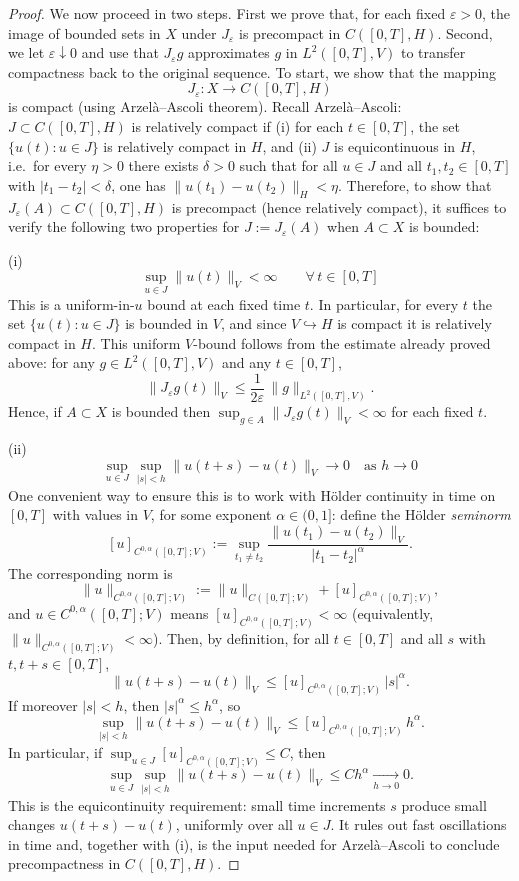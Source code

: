 \documentclass[11pt]{article}
\theoremstyle{definition}
\theoremstyle{remark}
\begin{document}
\begin{proof}
We now proceed in two steps. First we prove that, for each fixed \(\varepsilon>0\), the image of bounded sets in \(X\) under \(J_\varepsilon\) is precompact in \(C([0,T],H)\). Second, we let \(\varepsilon\downarrow 0\) and use that \(J_\varepsilon g\) approximates \(g\) in \(L^{2}([0,T],V)\) to transfer compactness back to the original sequence.
To start, we show that the mapping
\[
J_\varepsilon:X\to C([0,T],H)
\]
is compact (using Arzel\`a--Ascoli theorem).
Recall Arzel\`a--Ascoli: \(J\subset C([0,T],H)\) is relatively compact if (i) for each \(t\in[0,T]\), the set \(\{u(t):u\in J\}\) is relatively compact in \(H\), and (ii) \(J\) is equicontinuous in \(H\), i.e.\ for every \(\eta>0\) there exists \(\delta>0\) such that for all \(u\in J\) and all \(t_{1},t_{2}\in[0,T]\) with \(|t_{1}-t_{2}|<\delta\), one has \(\|u(t_{1})-u(t_{2})\|_{H}<\eta\).
Therefore, to show that \(J_\varepsilon(A)\subset C([0,T],H)\) is precompact (hence relatively compact), it suffices to verify the following two properties for \(J:=J_\varepsilon(A)\) when \(A\subset X\) is bounded:

(i)
\[
\sup_{u\in J}\|u(t)\|_{V}<\infty\qquad \forall\,t\in[0,T]
\]
This is a uniform-in-\(u\) bound at each fixed time \(t\).
In particular, for every \(t\) the set \(\{u(t):u\in J\}\) is bounded in \(V\), and since \(V\hookrightarrow H\) is compact it is relatively compact in \(H\).
This uniform \(V\)-bound follows from the estimate already proved above: for any \(g\in L^{2}([0,T],V)\) and any \(t\in[0,T]\),
\[
\|J_\varepsilon g(t)\|_{V}\le \frac{1}{2\varepsilon}\,\|g\|_{L^{2}([0,T],V)}.
\]
Hence, if \(A\subset X\) is bounded then \(\sup_{g\in A}\|J_\varepsilon g(t)\|_{V}<\infty\) for each fixed \(t\).

(ii)
\[
\sup_{u\in J}\sup_{|s|<h}\|u(t+s)-u(t)\|_{V}\to 0
\quad \text{as }h\to 0
\]
One convenient way to ensure this is to work with H\"older continuity in time on \([0,T]\) with values in \(V\), for some exponent \(\alpha\in(0,1]\): define the H\"older \emph{seminorm}
\[
[u]_{C^{0,\alpha}([0,T];V)}
:=\sup_{t_{1}\neq t_{2}}\frac{\|u(t_{1})-u(t_{2})\|_{V}}{|t_{1}-t_{2}|^{\alpha}}.
\]
The corresponding norm is
\[
\|u\|_{C^{0,\alpha}([0,T];V)}:=\|u\|_{C([0,T];V)}+[u]_{C^{0,\alpha}([0,T];V)},
\]
and \(u\in C^{0,\alpha}([0,T];V)\) means \([u]_{C^{0,\alpha}([0,T];V)}<\infty\) (equivalently, \(\|u\|_{C^{0,\alpha}([0,T];V)}<\infty\)).
Then, by definition, for all \(t\in[0,T]\) and all \(s\) with \(t,t+s\in[0,T]\),
\[
\|u(t+s)-u(t)\|_{V}\le [u]_{C^{0,\alpha}([0,T];V)}\,|s|^{\alpha}.
\]
If moreover \(|s|<h\), then \(|s|^{\alpha}\le h^{\alpha}\), so
\[
\sup_{|s|<h}\|u(t+s)-u(t)\|_{V}\le [u]_{C^{0,\alpha}([0,T];V)}\,h^{\alpha}.
\]
In particular, if \(\sup_{u\in J}[u]_{C^{0,\alpha}([0,T];V)}\le C\), then
\[
\sup_{u\in J}\sup_{|s|<h}\|u(t+s)-u(t)\|_{V}\le Ch^{\alpha}\xrightarrow[h\to 0]{}0.
\]
This is the equicontinuity requirement: small time increments \(s\) produce small changes \(u(t+s)-u(t)\), uniformly over all \(u\in J\).
It rules out fast oscillations in time and, together with (i), is the input needed for Arzel\`a--Ascoli to conclude precompactness in \(C([0,T],H)\).


\end{proof}
\end{document}
